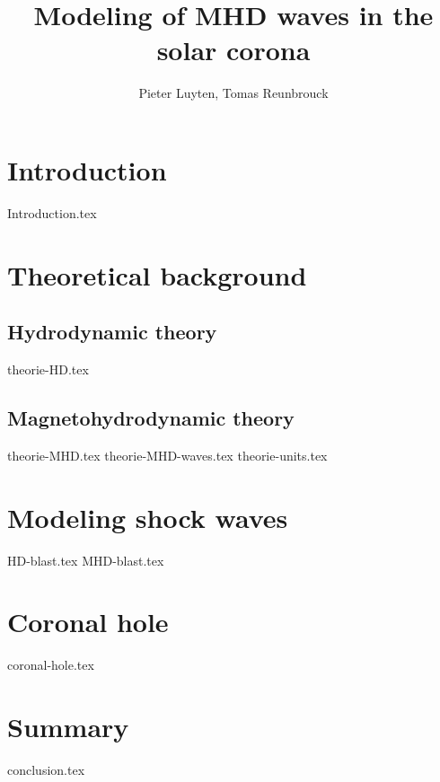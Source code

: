 \documentclass[a4paper]{article}
\title{Modeling of MHD waves in the solar corona}
\author{Pieter Luyten, Tomas Reunbrouck}
\begin{document}
\maketitle
\newpage
\tableofcontents
\newpage

\section{Introduction}
{Introduction.tex}
\newpage

\section{Theoretical background}

\subsection{Hydrodynamic theory}
{theorie-HD.tex}

\subsection{Magnetohydrodynamic theory}
{theorie-MHD.tex}
{theorie-MHD-waves.tex}
{theorie-units.tex}
\newpage

\section{Modeling shock waves}
{HD-blast.tex}
\newpage
{MHD-blast.tex}
\newpage

\section{Coronal hole}
{coronal-hole.tex}
\newpage

\section{Summary}
{conclusion.tex}


\end{document}
